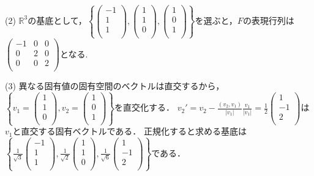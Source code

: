 \documentclass[
		book,
		head_space=20mm,
		foot_space=20mm,
		gutter=10mm,
		line_length=190mm
]{jlreq}
\begin{document}
(2) $\mathbb{R}^3$の基底として，$\left\{\begin{pmatrix}
-1 \\
1 \\
1 \\
\end{pmatrix},\begin{pmatrix}
1 \\
1 \\
0 \\
\end{pmatrix},\begin{pmatrix}
1 \\
0 \\
1 \\
\end{pmatrix}\right\}$を選ぶと，$F$の表現行列は$\begin{pmatrix}
	-1 & 0 & 0 \\
	0 & 2 & 0 \\
	0 & 0 & 2 \\
\end{pmatrix}$となる.

(3) 異なる固有値の固有空間のベクトルは直交するから，$\left\{v_1=\begin{pmatrix}
1 \\
1 \\
0 \\
\end{pmatrix},v_2=\begin{pmatrix}
1 \\
0 \\
1 \\
\end{pmatrix}\right\}$を直交化する．
$v_2' = v_2 - \frac{(v_2,v_1)}{|v_1|} \frac{v_1}{|v_1|}= \frac{1}{2} \begin{pmatrix}
1 \\
-1 \\
2 \\
\end{pmatrix}$は$v_1$と直交する固有ベクトルである．
正規化すると求める基底は$\left\{\frac{1}{\sqrt{3}}\begin{pmatrix}
	-1 \\
	1 \\
	1 \\
	\end{pmatrix},\frac{1}{\sqrt{2}}\begin{pmatrix}
	1 \\
	1 \\
	0 \\
	\end{pmatrix},\frac{1}{\sqrt{6}}\begin{pmatrix}
	1 \\
	-1 \\
	2 \\
	\end{pmatrix}\right\}$である．
\end{document}
